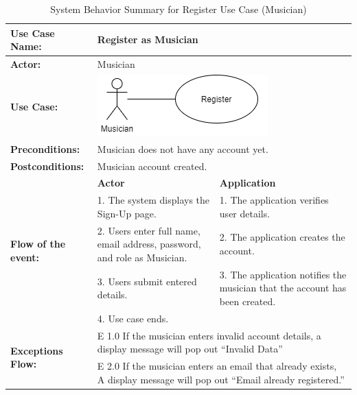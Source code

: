 \begin{longtable}{|p{3cm}|p{5cm}|p{5cm}|}
    \caption{\centering System Behavior Summary for Register Use Case (Musician)} \\
    \hline
    \textbf{Use Case Name:} & \multicolumn{2}{l|}{Register as Musician} \\ \hline
    \textbf{Actor:} & \multicolumn{2}{l|}{Musician} \\ \hline
    \textbf{Use Case:} & \multicolumn{2}{l|}{\includegraphics[width=0.5\linewidth]{mainmatter/images/sucd1.png}} \\ \hline
    \textbf{Preconditions:} & \multicolumn{2}{p{10cm}|}{Musician does not have any account yet.} \\ \hline
    \textbf{Postconditions:} & \multicolumn{2}{p{10cm}|}{Musician account created.} \\ \hline
    \multirow{5}{3cm}{\raggedright \textbf{Flow of the event:}} & \textbf{Actor} & \textbf{Application} \\ \cline{2-3}
    & 1. The system displays the Sign-Up page. & 1. The application verifies user details. \\ \cline{2-3}
    & 2. Users enter full name, email address, password, and role as Musician. & 2. The application creates the account.  \\ \cline{2-3}
    & 3. Users submit entered details. & 3. The application notifies the musician that the account has been created.  \\ \cline{2-3}
    & 4. Use case ends. &  \\ \hline
    \multirow{2}{3cm}{\raggedright \textbf{Exceptions Flow:}} 
    & \multicolumn{2}{p{10cm}|}{\raggedright E 1.0 If the musician enters invalid account details, a display message will pop out “Invalid Data”} \\ \cline{2-3}
    & \multicolumn{2}{p{10cm}|}{\raggedright E 2.0 If the musician enters an email that already exists, A display message will pop out “Email already registered.”} \\ \hline
\end{longtable}
\pagebreak

